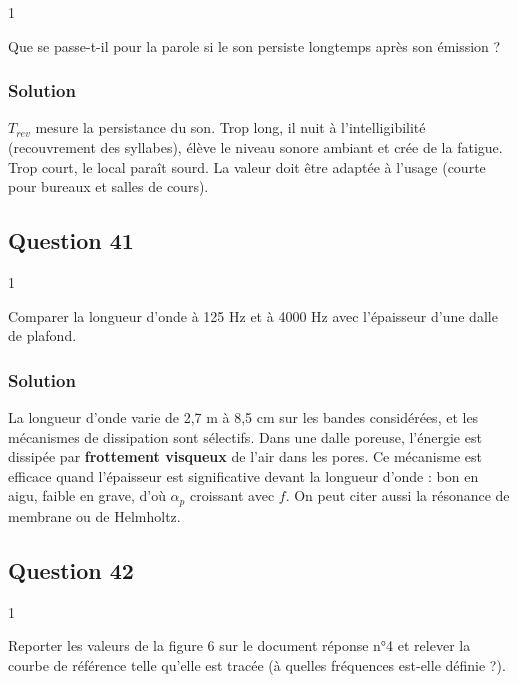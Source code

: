 \documentclass[11pt,a4paper]{article}
\begin{document}
\begin{indication}{1}

Que se passe-t-il pour la parole si le son persiste longtemps après son émission ?

\end{indication}

\hypertarget{solution-39}{%
\subsubsection{Solution}\label{solution-39}}

\(T_{rev}\) mesure la persistance du son. Trop long, il nuit à l'intelligibilité (recouvrement des syllabes), élève le niveau sonore ambiant et crée de la fatigue. Trop court, le local paraît sourd. La valeur doit être adaptée à l'usage (courte pour bureaux et salles de cours).

\hypertarget{question-41}{%
\subsection{Question 41}\label{question-41}}

\begin{indication}{1}

Comparer la longueur d'onde à 125 Hz et à 4000 Hz avec l'épaisseur d'une dalle de plafond.

\end{indication}

\hypertarget{solution-40}{%
\subsubsection{Solution}\label{solution-40}}

La longueur d'onde varie de 2,7 m à 8,5 cm sur les bandes considérées, et les mécanismes de dissipation sont sélectifs. Dans une dalle poreuse, l'énergie est dissipée par \textbf{frottement visqueux} de l'air dans les pores. Ce mécanisme est efficace quand l'épaisseur est significative devant la longueur d'onde : bon en aigu, faible en grave, d'où \(\alpha_p\) croissant avec \(f\). On peut citer aussi la résonance de membrane ou de Helmholtz.

\hypertarget{question-42}{%
\subsection{Question 42}\label{question-42}}

\begin{indication}{1}

Reporter les valeurs de la figure 6 sur le document réponse n°4 et relever la courbe de référence telle qu'elle est tracée (à quelles fréquences est-elle définie ?).

\end{indication}
\end{document}
